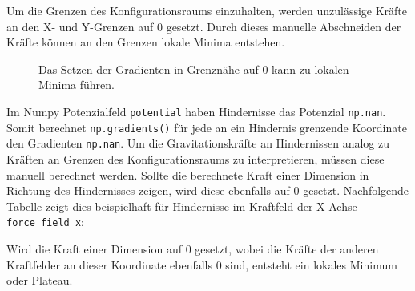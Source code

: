 Um die Grenzen des Konfigurationsraums einzuhalten, werden unzulässige Kräfte an den X- und Y-Grenzen auf $0$ gesetzt. Durch dieses manuelle Abschneiden der Kräfte können an den Grenzen lokale Minima entstehen.
\begin{figure}[H]
	\centering
	\footnotesize
	\centerline{\resizebox{0.65\linewidth}{!}{}}
	\caption{Das Setzen der Gradienten in Grenznähe auf $0$ kann zu lokalen Minima führen.}
\end{figure}
\vspace*{-0.1cm}
Im Numpy Potenzialfeld \texttt{potential} haben Hindernisse das Potenzial \texttt{np.nan}. Somit berechnet \texttt{np.gradients()} für jede an ein Hindernis grenzende Koordinate den Gradienten \texttt{np.nan}.
Um die Gravitationskräfte an Hindernissen analog zu Kräften an Grenzen des Konfigurationsraums zu interpretieren, müssen diese manuell berechnet werden. 
Sollte die berechnete Kraft einer Dimension in Richtung des Hindernisses zeigen, wird diese ebenfalls auf $0$ gesetzt. Nachfolgende Tabelle zeigt dies beispielhaft für Hindernisse im Kraftfeld der X-Achse \texttt{force\_field\_x}:
\begin{table}[H]
\centerline{}
\end{table}
Wird die Kraft einer Dimension auf $0$ gesetzt, wobei die Kräfte der anderen Kraftfelder an dieser Koordinate ebenfalls $0$ sind, entsteht ein lokales Minimum oder Plateau.

